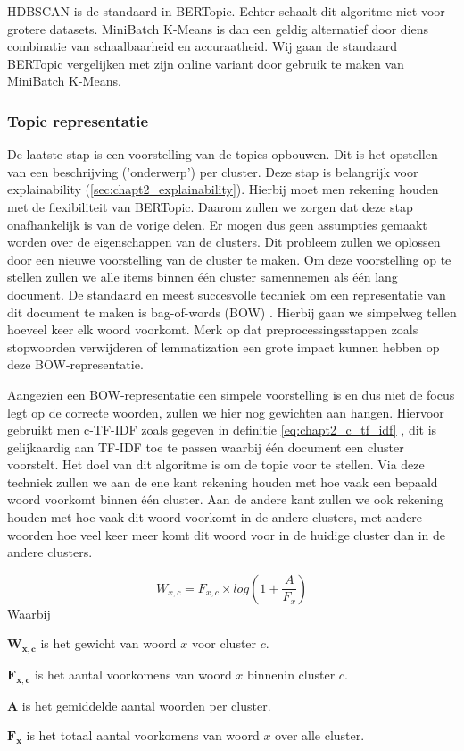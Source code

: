 HDBSCAN is de standaard in BERTopic. Echter schaalt dit algoritme niet voor grotere datasets. MiniBatch K-Means is dan een geldig alternatief door diens combinatie van schaalbaarheid en accuraatheid. Wij gaan de standaard BERTopic vergelijken met zijn online variant door gebruik te maken van MiniBatch K-Means.

\subsubsection{Topic representatie}
\label{sub:topic_representatie}
De laatste stap is een voorstelling van de topics opbouwen. Dit is het opstellen van een beschrijving ('onderwerp') per cluster. Deze stap is belangrijk voor explainability (\autoref{sec:chapt2_explainability}).  Hierbij moet men rekening houden met de flexibiliteit van BERTopic. Daarom zullen we zorgen dat deze stap onafhankelijk is van de vorige delen. Er mogen dus geen assumpties gemaakt worden over de eigenschappen van de clusters. Dit probleem zullen we oplossen door een nieuwe voorstelling van de cluster te maken. Om deze voorstelling op te stellen zullen we alle items binnen één cluster samennemen als één lang document. De standaard en meest succesvolle techniek om een representatie van dit document te maken is bag-of-words (BOW) \cite{bag_of_words_blog}. Hierbij gaan we simpelweg tellen hoeveel keer elk woord voorkomt. Merk op dat preprocessingsstappen zoals stopwoorden verwijderen of lemmatization een grote impact kunnen hebben op deze BOW-representatie.

Aangezien een BOW-representatie een simpele voorstelling is en dus niet de focus legt op de correcte woorden, zullen we hier nog gewichten aan hangen. Hiervoor gebruikt men c-TF-IDF zoals gegeven in definitie \ref{eq:chapt2_c_tf_idf} \cite{bertopic_algo}, dit is gelijkaardig aan TF-IDF toe te passen waarbij één document een cluster voorstelt. Het doel van dit algoritme is om de topic voor te stellen. Via deze techniek zullen we aan de ene kant rekening houden met hoe vaak een bepaald woord voorkomt binnen één cluster. Aan de andere kant zullen we ook rekening houden met hoe vaak dit woord voorkomt in de andere clusters, met andere woorden hoe veel keer meer komt dit woord voor in de huidige cluster dan in de andere clusters.

\begin{equation}
    W_{x,c} = F_{x,c} \times log(1 + \frac{A}{F_x})
    \label{eq:chapt2_c_tf_idf}
\end{equation}
Waarbij
\begin{description}
    \item$\mathbf{W_{x,c}}$ is het gewicht van woord $x$ voor cluster $c$.
    \item$\mathbf{F_{x,c}}$ is het aantal voorkomens van woord $x$ binnenin cluster $c$.
    \item$\mathbf{A}$ is het gemiddelde aantal woorden per cluster.
    \item$\mathbf{F_{x}}$ is het totaal aantal voorkomens van woord $x$ over alle cluster.
\end{description}

